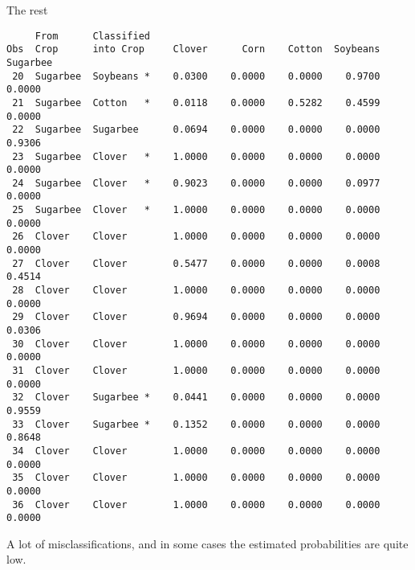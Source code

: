 \documentclass[pdf]{prosper}
\begin{document}
\begin{slide}{The rest}

{\scriptsize
\begin{verbatim}
     From      Classified
Obs  Crop      into Crop     Clover      Corn    Cotton  Soybeans  Sugarbee
 20  Sugarbee  Soybeans *    0.0300    0.0000    0.0000    0.9700    0.0000
 21  Sugarbee  Cotton   *    0.0118    0.0000    0.5282    0.4599    0.0000
 22  Sugarbee  Sugarbee      0.0694    0.0000    0.0000    0.0000    0.9306
 23  Sugarbee  Clover   *    1.0000    0.0000    0.0000    0.0000    0.0000
 24  Sugarbee  Clover   *    0.9023    0.0000    0.0000    0.0977    0.0000
 25  Sugarbee  Clover   *    1.0000    0.0000    0.0000    0.0000    0.0000
 26  Clover    Clover        1.0000    0.0000    0.0000    0.0000    0.0000
 27  Clover    Clover        0.5477    0.0000    0.0000    0.0008    0.4514
 28  Clover    Clover        1.0000    0.0000    0.0000    0.0000    0.0000
 29  Clover    Clover        0.9694    0.0000    0.0000    0.0000    0.0306
 30  Clover    Clover        1.0000    0.0000    0.0000    0.0000    0.0000
 31  Clover    Clover        1.0000    0.0000    0.0000    0.0000    0.0000
 32  Clover    Sugarbee *    0.0441    0.0000    0.0000    0.0000    0.9559
 33  Clover    Sugarbee *    0.1352    0.0000    0.0000    0.0000    0.8648
 34  Clover    Clover        1.0000    0.0000    0.0000    0.0000    0.0000
 35  Clover    Clover        1.0000    0.0000    0.0000    0.0000    0.0000
 36  Clover    Clover        1.0000    0.0000    0.0000    0.0000    0.0000

\end{verbatim}
}

A lot of misclassifications, and in some cases the estimated probabilities are quite low.
  
\end{slide}
\end{document}
